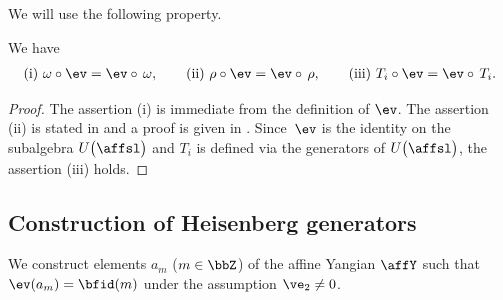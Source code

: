 We will use the following property.
\begin{prop}\label{prop:ev_and_auto}We have
\begin{gather*}
\mathrm{(i)}\ \omega \circ \ev = \ev \circ \,\omega, \qquad \mathrm{(ii)}\ \rho \circ \ev = \ev \circ\, \rho,\qquad \mathrm{(iii)}\ T_i \circ \ev = \ev \circ\, T_i.
\end{gather*}
\end{prop}
\begin{proof}The assertion (i) is immediate from the definition of $\ev$. The assertion (ii) is stated in \cite[Section~6, p.~463]{MR2323534} and a proof is given in \cite[Proposition~3.6]{kodera_evaluation}. Since~$\ev$ is the identity on the subalgebra $U\big(\affsl\big)$ and $T_i$ is defined via the generators of $U\big(\affsl\big)$, the assertion (iii) holds.
\end{proof}

\subsection{Construction of Heisenberg generators}

We construct elements $a_m$ ($m \in \bbZ$) of the affine Yangian $\affY$ such that $\ev(a_m) = \bfid(m)$ under the assumption $\ve_2 \neq 0$.


